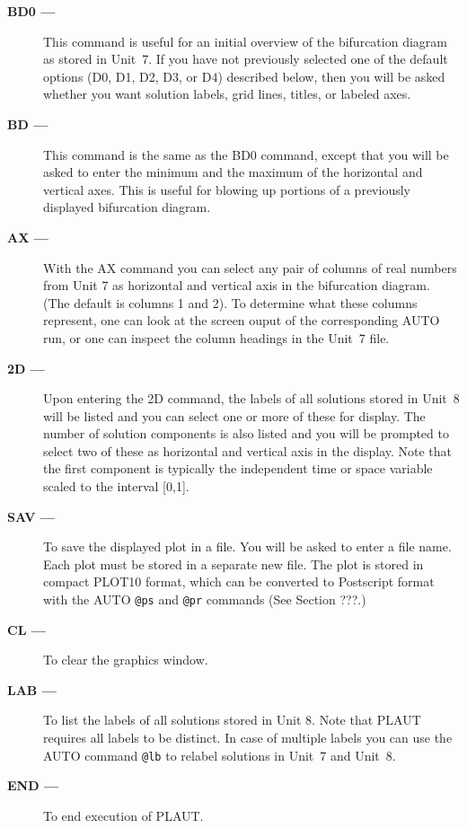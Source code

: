 \begin{description}
\item[\bf BD0 ---] This command is useful for an initial overview of the bifurcation
                   diagram as stored in Unit~7.
                   If you have not previously selected one of the default options 
                   (D0, D1, D2, D3, or D4) described below, then you will be asked
                   whether you want solution labels, grid lines, titles, or labeled axes.

\item[\bf BD ---]  This command is the same as the BD0 command, except that you will be
                   asked to enter the minimum and the maximum of the horizontal and 
                   vertical axes.
                   This is useful for blowing up portions of a previously displayed
                   bifurcation diagram.

\item[\bf AX ---]  With the AX command you can select any pair of columns of real
                   numbers from Unit 7 as horizontal and vertical axis in the
                   bifurcation diagram. (The default is columns 1 and 2).
                   To determine what these columns represent, one can look at the
                   screen ouput of the corresponding AUTO run, or one can inspect the
                   column headings in the Unit~7 file.
                                 
\item[\bf 2D ---]  Upon entering the 2D command, the labels of all solutions stored 
                   in Unit~8 will be listed and you can select one or more of these 
                   for display. The number of solution components is also listed
                   and you will be prompted to select two of these as horizontal and
                   vertical axis in the display.
                   Note that the first component is typically the independent 
                   time or space variable scaled to the interval [0,1].

\item[\bf SAV ---] To save the displayed plot in a file. You will be asked to enter
                   a file name. Each plot must be stored in a separate new file.
                   The plot is stored in compact PLOT10 format, which can be converted to 
                   Postscript format with the AUTO {\tt @ps} and {\tt @pr}
                   commands (See Section ???.)

\item[\bf CL ---]  To clear the graphics window.

\item[\bf LAB ---]  To list the labels of all solutions stored in Unit 8.
                    Note that PLAUT requires all labels to be distinct.
                    In case of multiple labels you can use the AUTO
                    command {\tt @lb} to relabel solutions in
                    Unit~7 and Unit~8.

\item[\bf END ---]  To end execution of PLAUT.
\end{description}


